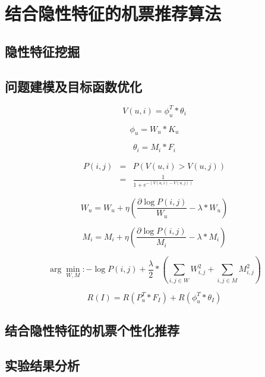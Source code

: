 
\chapter{结合隐性特征的机票推荐算法}
\label{chap:latent}

\section{隐性特征挖掘}

\section{问题建模及目标函数优化}

\begin{equation}
	V(u,i) = \phi_u^T * \theta_i
\end{equation}

\begin{equation}
	\phi_u = W_u * K_u
\end{equation}

\begin{equation}
	\theta_i = M_i * F_i
\end{equation}




\begin{eqnarray}
    P(i,j) & = & P(V(u,i) > V(u,j)) \nonumber \\
	 & = &\frac{1}{1+e^{-(V(u,i) - V(u,j))}}
\end{eqnarray}

\begin{equation}
	W_u = W_u + \eta(\frac{\partial \log P(i,j)}{W_u} - \lambda*W_u)
\end{equation}

\begin{equation}
	M_i = M_i + \eta(\frac{\partial \log P(i,j)}{M_i} - \lambda*M_i)
\end{equation}

\begin{equation}
  \arg\min_{W,M} : - \log P(i,j) + \frac{\lambda}{2} * (\sum_{i,j \in W}W_{i,j}^2 + \sum_{i,j \in M}M_{i,j}^2)
\end{equation}

\begin{equation}
	R(I) =  R(P_u^T * F_I) + R(\phi_u^T * \theta_I)
\end{equation}

\section{结合隐性特征的机票个性化推荐}

\section{实验结果分析}